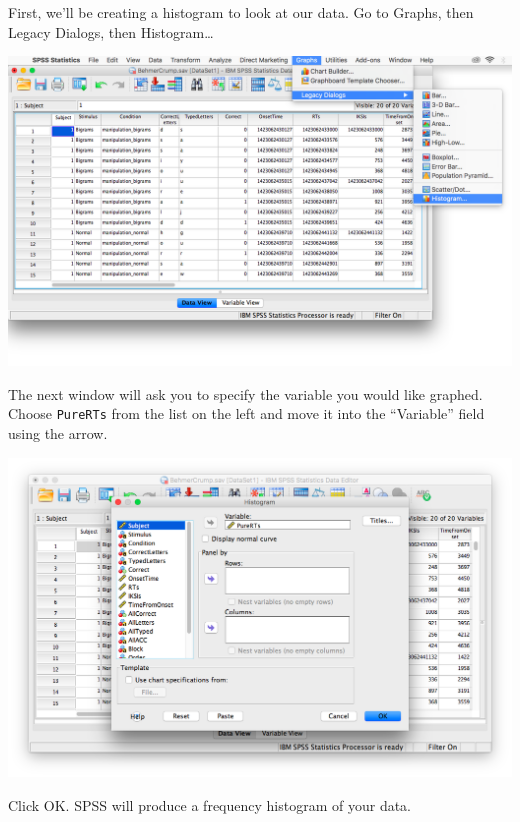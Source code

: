 \documentclass[
]{book}
\begin{document}
First, we'll be creating a histogram to look at our data. Go to {Graphs}, then {Legacy Dialogs}, then {Histogram\ldots{}}

\includegraphics{img/9.4.12.png}

The next window will ask you to specify the variable you would like graphed. Choose \texttt{PureRTs} from the list on the left and move it into the ``Variable'' field using the arrow.

\includegraphics{img/9.4.13.png}

Click {OK}. SPSS will produce a frequency histogram of your data.
\end{document}
